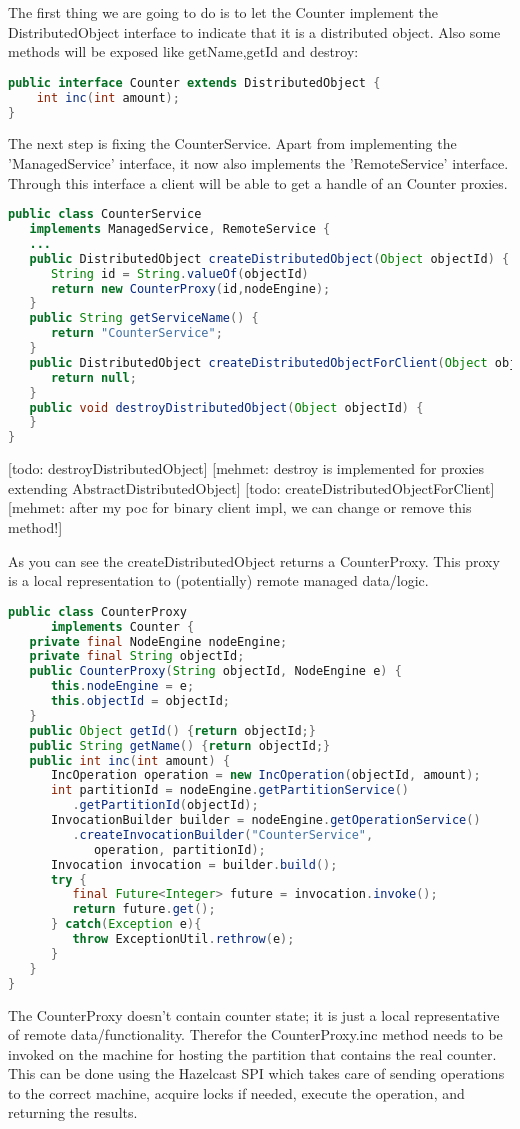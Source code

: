 The first thing we are going to do is to let the Counter implement the DistributedObject interface to indicate that it is a distributed object. Also some methods will be exposed like getName,getId and destroy:
\begin{lstlisting}[language=java]
public interface Counter extends DistributedObject {
    int inc(int amount);
}
\end{lstlisting}

The next step is fixing the CounterService. Apart from implementing the 'ManagedService' interface, it now also implements the 'RemoteService' interface. Through this interface a client will be able to get a handle of an Counter proxies. 
\begin{lstlisting}[language=java]
public class CounterService 
   implements ManagedService, RemoteService {
   ...  
   public DistributedObject createDistributedObject(Object objectId) {
      String id = String.valueOf(objectId)
      return new CounterProxy(id,nodeEngine);
   }
   public String getServiceName() {
      return "CounterService";
   }
   public DistributedObject createDistributedObjectForClient(Object objectId) {
      return null;
   }
   public void destroyDistributedObject(Object objectId) {
   }
}
\end{lstlisting}
[todo: destroyDistributedObject] [mehmet: destroy is implemented for proxies extending AbstractDistributedObject]
[todo: createDistributedObjectForClient] [mehmet: after my poc for binary client impl, we can change or remove this method!]

As you can see the createDistributedObject returns a CounterProxy. This proxy is a local representation to (potentially) remote managed data/logic.  
\begin{lstlisting}[language=java]
public class CounterProxy 
      implements Counter {
   private final NodeEngine nodeEngine;
   private final String objectId;
   public CounterProxy(String objectId, NodeEngine e) {
      this.nodeEngine = e;
      this.objectId = objectId;
   }
   public Object getId() {return objectId;}
   public String getName() {return objectId;}
   public int inc(int amount) {
      IncOperation operation = new IncOperation(objectId, amount);   
      int partitionId = nodeEngine.getPartitionService()
         .getPartitionId(objectId);
      InvocationBuilder builder = nodeEngine.getOperationService()
         .createInvocationBuilder("CounterService", 
            operation, partitionId);
      Invocation invocation = builder.build();
      try {
         final Future<Integer> future = invocation.invoke();
         return future.get();
      } catch(Exception e){
         throw ExceptionUtil.rethrow(e);
      }
   }
}
\end{lstlisting}
The CounterProxy doesn't contain counter state; it is just a local representative of remote data/functionality. Therefor the CounterProxy.inc method needs to be invoked on the machine for hosting the partition that contains the real counter. This can be done using the Hazelcast SPI which takes care of sending operations to the correct machine, acquire locks if needed, execute the operation, and returning the results.

